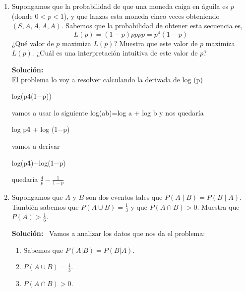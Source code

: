 \documentclass[11pt,letterpaper]{article}
\newenvironment{solution}{%
  \noindent\begin{shaded}
  \textbf{Solución:}\ }{
  \end{shaded}%
}
\begin{document}
\begin{enumerate}
\begin{solution}
Caso 4: Sería cuando se obtiene los demás números 2,4,5 en este caso no sumas o restas puntos se queda igual. Entonces lo defino como V=3/6 V\\

Con los datos obtenidos se puede escribir de la siguiente manera:

V= 1/6 (V+a) + 1/6 (V-b) + 3/6 V

V=1/6 V+1/6 a+1/6 V−1/6 b+3/6 V \\
V=5/6 V + 1/6 a - 1/6 b\\
1/6 V = 1/6 a - 1/6 b\\
V= a-b
 
  \end{solution}
\item%
  Supongamos que la probabilidad de que una moneda caiga en águila es
  \(p\) (donde \(0 < p < 1\)), y que lanzas esta moneda cinco veces
  obteniendo \(\left(S, A, A, A, A\right)\).  Sabemos que la
  probabilidad de obtener esta secuencia es,
  \[ L(p) = (1-p)pppp = p^4(1-p) \]
  ¿Qué valor de \(p\) maximiza \(L(p)\)? Muestra que este valor de
  \(p\) maximiza \(L(p)\). ¿Cuál es una interpretación intuitiva de
  este valor de \(p\)?
  \begin{solution}
\\El problema lo voy a resolver calculando la derivada de log (p)

log(p4(1−p))

vamos a usar lo siguiente log(ab)=log a + log b y nos quedaría 

log p\^4 + log (1−p)

vamos a derivar 

log(p\^4)+log(1−p)

quedaría \( \frac{4}{p} - \frac{1}{1 - p} \)



  \end{solution}
\item%
  Supongamos que \(A\) y \(B\) son dos eventos tales que \(P(A \mid B)
  = P(B \mid A)\).  También sabemos que \(P(A \cup B) = \frac{1}{3}\)
  y que \(P(A \cap B) > 0\).  Muestra que \(P(A) > \frac{1}{6}\).
  \begin{solution}
    Vamos a analizar los datos que nos da el problema:
\begin{enumerate}
    \item Sabemos que $P(A|B) = P(B|A)$.
    \item $P(A \cup B) = \frac{1}{3}$.
    \item $P(A \cap B) > 0$.
\end{enumerate}


\end{solution}
\end{enumerate}
\end{document}
